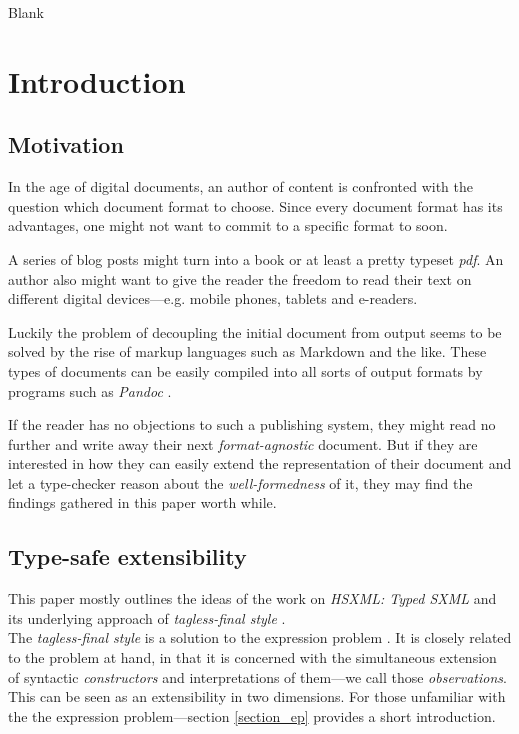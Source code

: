 \clearpage
Blank
\clearpage

\section{Introduction}

\subsection{Motivation}

In the age of digital documents, an author of content is confronted with the
question which document format to choose. Since every document format has its
advantages, one might not want to commit to a specific format to soon.

A series of blog posts might turn into a book or at least a pretty typeset
\emph{pdf}. An author also might want to give the reader the freedom to read
their text on different digital devices—e.g. mobile phones, tablets and e-readers.

Luckily the problem of decoupling the initial document from output seems to be
solved by the rise of markup languages such as Markdown and the like. These
types of documents can be easily compiled into all sorts of output formats by
programs such as \emph{Pandoc} \cite{pandoc}.

If the reader has no objections to such a publishing system, they might read no
further and write away their next \emph{format-agnostic} document. But if they
are interested in how they can easily extend the representation of their
document and let a type-checker reason about the \emph{well-formedness} of it,
they may find the findings gathered in this paper worth while.

\subsection{Type-safe extensibility}

This paper mostly outlines the ideas of the work on \emph{HSXML: Typed SXML}
\cite{hsxml} and its underlying approach of \emph{tagless-final style}
\cite{finally-tagless, finally-tagless-tut}.\\
The \emph{tagless-final style} is a solution to the expression problem
\cite{expression-problem}. It is closely related to the problem at hand, in that
it is concerned with the simultaneous extension of syntactic \emph{constructors} and
interpretations of them—we call those \emph{observations}. This can be seen as an
extensibility in two dimensions. For those unfamiliar with the the expression
problem—section \ref{section_ep} provides a short introduction.

